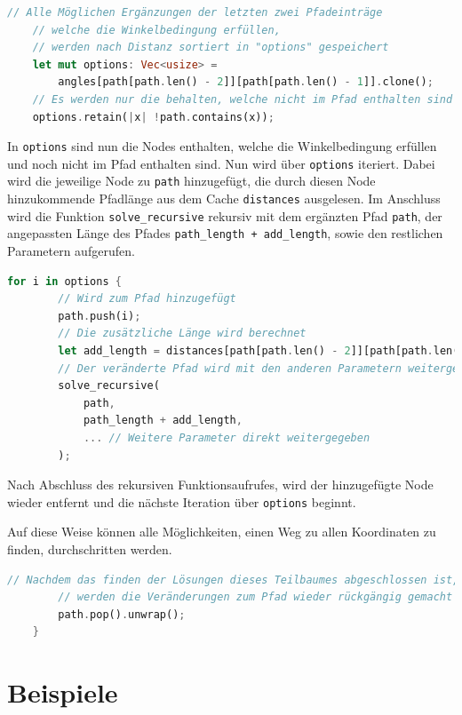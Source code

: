 \documentclass[a4paper,10pt,ngerman]{scrartcl}
\begin{document}
\lstset{style=boxed}
\begin{lstlisting}[language=Rust]
    // Alle Möglichen Ergänzungen der letzten zwei Pfadeinträge
    // welche die Winkelbedingung erfüllen,
    // werden nach Distanz sortiert in "options" gespeichert
    let mut options: Vec<usize> = 
    	angles[path[path.len() - 2]][path[path.len() - 1]].clone();
    // Es werden nur die behalten, welche nicht im Pfad enthalten sind
    options.retain(|x| !path.contains(x));
\end{lstlisting}
\lstset{style=reference}
In \lstinline{options} sind nun die Nodes enthalten, welche die Winkelbedingung erfüllen und noch nicht im Pfad enthalten sind. Nun wird über \lstinline{options} iteriert. Dabei wird die jeweilige Node zu \lstinline{path} hinzugefügt, die durch diesen Node hinzukommende Pfadlänge aus dem Cache \lstinline{distances} ausgelesen.
Im Anschluss wird die Funktion \lstinline{solve_recursive} rekursiv mit dem ergänzten Pfad \lstinline{path}, der angepassten Länge des Pfades \lstinline{path_length + add_length}, sowie den restlichen Parametern aufgerufen. 
\lstset{style=boxed}
\begin{lstlisting}[language=Rust]
    for i in options {
        // Wird zum Pfad hinzugefügt
        path.push(i);
        // Die zusätzliche Länge wird berechnet
        let add_length = distances[path[path.len() - 2]][path[path.len() - 1]];
        // Der veränderte Pfad wird mit den anderen Parametern weitergegeben
        solve_recursive(
            path, 
            path_length + add_length, 
            ... // Weitere Parameter direkt weitergegeben
        ); 

\end{lstlisting}
\lstset{style=reference}
Nach Abschluss des rekursiven Funktionsaufrufes, wird der hinzugefügte Node wieder entfernt und die nächste Iteration über \lstinline{options} beginnt. 

Auf diese Weise können alle Möglichkeiten, einen Weg zu allen Koordinaten zu finden, durchschritten werden.
\lstset{style=boxed}
\begin{lstlisting}[language=Rust]
        // Nachdem das finden der Lösungen dieses Teilbaumes abgeschlossen ist, 
        // werden die Veränderungen zum Pfad wieder rückgängig gemacht 
        path.pop().unwrap();
    }
\end{lstlisting}
\lstset{style=reference}

\section{Beispiele}
\end{document}

